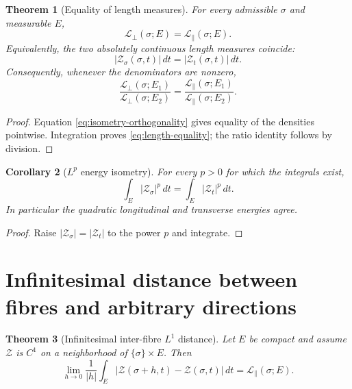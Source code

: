 \documentclass[11pt]{amsart}
\numberwithin{equation}{section}
\newtheorem{theorem}{Theorem}[section]
\newtheorem{corollary}[theorem]{Corollary}
\newcommand{\Zcal}{\mathcal Z}
\newcommand{\dd}{\,d}
\begin{document}
\begin{theorem}[Equality of length measures]
For every admissible $\sigma$ and measurable $E$,
\begin{equation}
\boxed{
\mathcal L_\perp(\sigma;E)=\mathcal L_\parallel(\sigma;E).
}
\label{eq:length-equality}
\end{equation}
Equivalently, the two absolutely continuous length measures coincide:
\begin{equation}
\boxed{
|\Zcal_\sigma(\sigma,t)|\dd t
=|\Zcal_t(\sigma,t)|\dd t.
}
\label{eq:length-measures}
\end{equation}
Consequently, whenever the denominators are nonzero,
\begin{equation}
\boxed{
\frac{\mathcal L_\perp(\sigma;E_1)}{\mathcal L_\perp(\sigma;E_2)}
=
\frac{\mathcal L_\parallel(\sigma;E_1)}{\mathcal L_\parallel(\sigma;E_2)}.
}
\label{eq:length-ratios}
\end{equation}
\end{theorem}

\begin{proof}
Equation \eqref{eq:isometry-orthogonality} gives equality of the densities pointwise.  Integration proves \eqref{eq:length-equality}; the ratio identity follows by division.
\end{proof}

\begin{corollary}[$L^p$ energy isometry]
For every $p>0$ for which the integrals exist,
\begin{equation}
\boxed{
\int_E|\Zcal_\sigma|^p\dd t
=
\int_E|\Zcal_t|^p\dd t.
}
\label{eq:Lp}
\end{equation}
In particular the quadratic longitudinal and transverse energies agree.
\end{corollary}

\begin{proof}
Raise $|\Zcal_\sigma|=|\Zcal_t|$ to the power $p$ and integrate.
\end{proof}

\section{Infinitesimal distance between fibres and arbitrary directions}

\begin{theorem}[Infinitesimal inter-fibre $L^1$ distance]
Let $E$ be compact and assume $\Zcal$ is $C^1$ on a neighborhood of $\{\sigma\}\times E$.  Then
\begin{equation}
\boxed{
\lim_{h\to0}\frac1{|h|}
\int_E|\Zcal(\sigma+h,t)-\Zcal(\sigma,t)|\dd t
=\mathcal L_\parallel(\sigma;E).
}
\label{eq:interfibre}
\end{equation}
\end{theorem}
\end{document}
